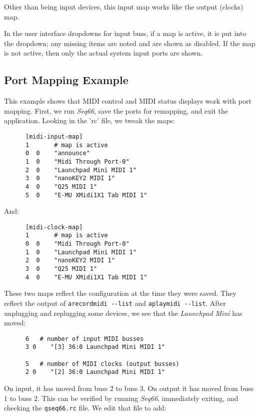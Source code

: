    Other than being input devices, this input map works like the output
   (clocks) map.

   In the user interface dropdowns for input buss, if a map is active, it is
   put into the dropdown; any missing items are noted and are shown as
   disabled.
   If the map is not active, then only the actual system input ports are shown.

\subsection{Port Mapping Example}
\label{subsec:input_port_mapping_example}

   This example shows that MIDI control and MIDI status displays work with
   port mapping.  First, we run \textsl{Seq66}, save the ports for
   remapping, and exit the application.  Looking in the 'rc' file, we tweak
   the maps:

   \begin{verbatim}
      [midi-input-map]
      1       # map is active
      0  0    "announce"
      1  0    "Midi Through Port-0"
      2  0    "Launchpad Mini MIDI 1"
      3  0    "nanoKEY2 MIDI 1"
      4  0    "Q25 MIDI 1"
      5  0    "E-MU XMidi1X1 Tab MIDI 1"
   \end{verbatim}

   And:

   \begin{verbatim}
      [midi-clock-map]
      1       # map is active
      0  0    "Midi Through Port-0"
      1  0    "Launchpad Mini MIDI 1"
      2  0    "nanoKEY2 MIDI 1"
      3  0    "Q25 MIDI 1"
      4  0    "E-MU XMidi1X1 Tab MIDI 1"
   \end{verbatim}

   These two maps reflect the configuration at the time they were saved.
   They reflect the output of \texttt{arecordmidi -{}-list} and
   \texttt{aplaymidi -{}-list}.
   After unplugging and replugging some devices, we see that the
   \textsl{Launchpad Mini} has moved:

   \begin{verbatim}
      6   # number of input MIDI busses
      3 0    "[3] 36:0 Launchpad Mini MIDI 1"

      5   # number of MIDI clocks (output busses)
      2 0    "[2] 36:0 Launchpad Mini MIDI 1"
   \end{verbatim}

   On input, it has moved from buss 2 to buss 3.
   On output it has moved from buss 1 to buss 2.
   This can be verified by running \textsl{Seq66}, immediately exiting,
   and checking the \texttt{qseq66.rc} file.
   We edit that file to add:


